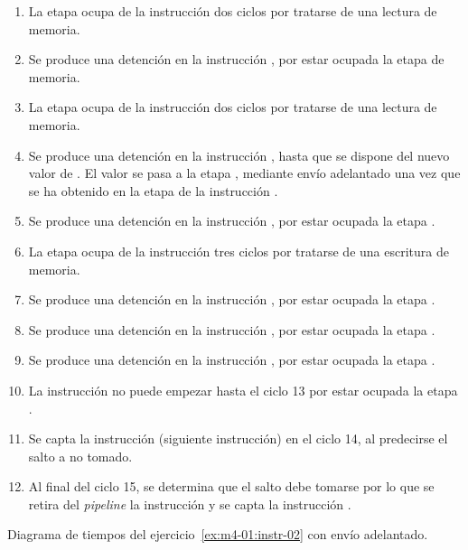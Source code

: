 \begin{enumerate}

\item La etapa  ocupa de la instrucción 
      dos ciclos por tratarse de una lectura de memoria.

\item Se produce una detención en la instrucción , 
      por estar ocupada la etapa de memoria.

\item La etapa  ocupa de la instrucción 
      dos ciclos por tratarse de una lectura de memoria.

\item Se produce una detención en la instrucción ,
      hasta que se dispone del nuevo valor de .
      El valor se pasa a la etapa ,
      mediante envío adelantado una vez que se ha obtenido 
      en la etapa  de la instrucción .

\item Se produce una detención en la instrucción ,
      por estar ocupada la etapa .

\item La etapa  ocupa de la instrucción 
      tres ciclos por tratarse de una escritura de memoria.

\item Se produce una detención en la instrucción ,
      por estar ocupada la etapa .

\item Se produce una detención en la instrucción ,
      por estar ocupada la etapa .

\item Se produce una detención en la instrucción ,
      por estar ocupada la etapa .

\item La instrucción  no puede empezar hasta el ciclo
      13 por estar ocupada la etapa .

\item Se capta la instrucción  (siguiente instrucción)
      en el ciclo 14, al predecirse el salto a no tomado.

\item Al final del ciclo 15, se determina que el salto debe tomarse
      por lo que se retira del \emph{pipeline} la instrucción 
      y se capta la instrucción .

\end{enumerate}

\begin{table}[htb]

\caption{Diagrama de tiempos del ejercicio~\ref{ex:m4-01:instr-02} con envío adelantado.}
\label{ex:m4-01:instr-02:chrono:forward}
\end{table}
